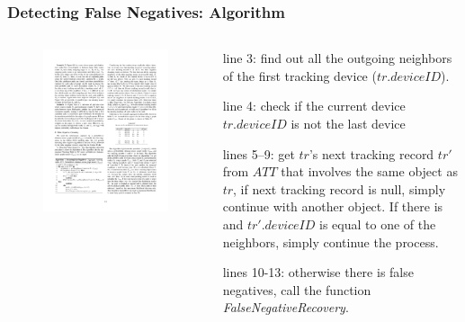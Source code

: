 
\begin{frame}
\frametitle{Detecting False Negatives: Algorithm}

\begin{columns}

  \begin{figure}[tb]
    \includegraphics[width=\columnwidth]{figures/3-3/3-3-7.pdf}
  \end{figure}

  \begin{sitemize}
    \item line 3: find out all the outgoing neighbors of the first tracking device ($tr.deviceID$).
    \item line 4: check if the current device $tr.deviceID$ is not the last device
    \item lines 5--9: get $tr$'s next tracking record $tr'$ from $ATT$ that involves the same object as $tr$, if next tracking record is null, simply continue with another object. If there is and $tr'.deviceID$ is equal to one of the neighbors, simply continue the process.
    \item lines 10-13: otherwise there is false negatives, call the function \emph{FalseNegativeRecovery}.
  \end{sitemize}

\end{columns}

\end{frame}

